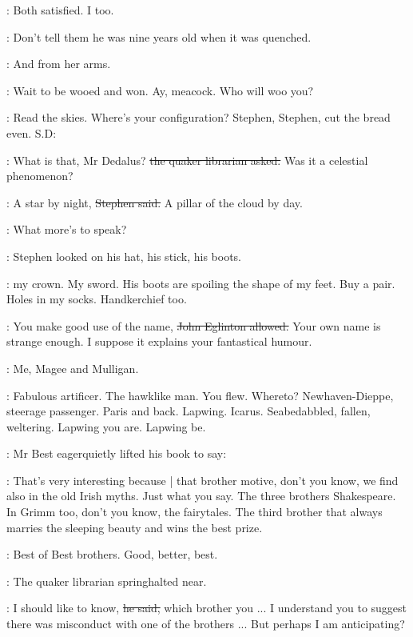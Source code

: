 \StephenInt:
Both satisfied.
I too.

\StephenInt:
Don't tell them he was nine years old when it was quenched.

\StephenInt:
And from her arms.

\StephenInt:
Wait to be wooed and won.
Ay,
meacock.
Who will woo you?

\StephenInt:
Read the skies.
Where's your configuration?
Stephen,
Stephen,
cut the bread even.
S.D:

\librarian:
What is that,
Mr Dedalus?
\sout{the quaker librarian asked.}
Was it a celestial phenomenon?

\Stephen:
A star by night,
\sout{Stephen said.}
A pillar of the cloud by day.

\StephenInt:
What more's to speak?

:
Stephen looked on his hat,
his stick,
his boots.

\StephenInt:
my crown.
My sword.
His boots are spoiling the shape of my feet.
Buy a pair.
Holes in my socks.
Handkerchief too.

\eglinton:
You make good use of the name,
\sout{John Eglinton allowed.}
Your own name is strange enough.
I suppose it explains your fantastical humour.

\StephenInt:
Me, Magee and Mulligan.

\StephenInt:
Fabulous artificer.
The hawklike man.
You flew.
Whereto?
Newhaven-Dieppe,
steerage passenger.
Paris and back.
Lapwing.
Icarus.
Seabedabbled, fallen, weltering.
Lapwing you are.
Lapwing be.

:
Mr Best eagerquietly lifted his book to say:

\best:
That's very interesting because |
that brother motive,
don't you know,
we find also in the old Irish myths.
Just what you say.
The three brothers Shakespeare.
In Grimm too,
don't you know,
the fairytales.
The third brother that always marries the sleeping beauty
and wins the best prize.

\StephenInt:
Best of Best brothers.
Good,
better,
best.

:
The quaker librarian springhalted near.

\librarian:
I should like to know,
\sout{he said,}
which brother you ...
I understand you to suggest there was misconduct with one of the brothers ...
But perhaps I am anticipating?

